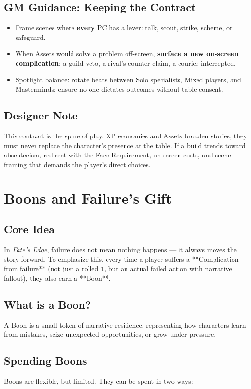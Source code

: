 \documentclass[12pt]{book}
\begin{document}
\section{GM Guidance: Keeping the Contract}
\begin{itemize}
  \item Frame scenes where \textbf{every} PC has a lever: talk, scout, strike, scheme, or safeguard.
  \item When Assets would solve a problem off-screen, \textbf{surface a new on-screen complication}: a guild veto, a rival’s counter-claim, a courier intercepted.
  \item Spotlight balance: rotate beats between Solo specialists, Mixed players, and Masterminds; ensure no one dictates outcomes without table consent.
\end{itemize}

\section{Designer Note}
This contract is the spine of play. XP economies and Assets broaden stories; they must never replace the character’s presence at the table. If a build trends toward absenteeism, redirect with the Face Requirement, on-screen costs, and scene framing that demands the player’s direct choices.

\chapter{Boons and Failure's Gift}

\section*{Core Idea}
In \textit{Fate’s Edge}, failure does not mean nothing happens — it always moves the story forward.  
To emphasize this, every time a player suffers a **Complication from failure** (not just a rolled \texttt{1}, but an actual failed action with narrative fallout), they also earn a **Boon**.

\section*{What is a Boon?}
A Boon is a small token of narrative resilience, representing how characters learn from mistakes, seize unexpected opportunities, or grow under pressure.

\section*{Spending Boons}
Boons are flexible, but limited. They can be spent in two ways:
\end{document}
